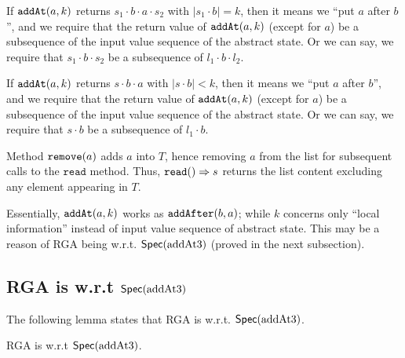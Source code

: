 If $\alabelshort[\mathtt{addAt}]{a,k}$ returns $s_1 \cdot b \cdot a \cdot s_2$ with $\vert s_1 \cdot b \vert = k$, then it means we ``put $a$ after $b$'', and we require that the return value of $\alabelshort[\mathtt{addAt}]{a,k}$ (except for $a$) be a subsequence of the input value sequence of the abstract state. Or we can say, we require that $s_1 \cdot b \cdot s_2$ be a subsequence of $l_1 \cdot b \cdot l_2$.

If $\alabelshort[\mathtt{addAt}]{a,k}$ returns $s \cdot b \cdot a$ with $\vert s \cdot b \vert < k$, then it means we ``put $a$ after $b$'', and we require that the return value of $\alabelshort[\mathtt{addAt}]{a,k}$ (except for $a$) be a subsequence of the input value sequence of the abstract state. Or we can say, we require that $s \cdot b$ be a subsequence of $l_1 \cdot b$.

Method $\alabelshort[\mathtt{remove}]{a}$ adds $a$ into $T$, hence removing $a$ from the list for subsequent calls to the $\mathtt{read}$ method. Thus, $\alabellong[\mathtt{read}]{}{s}{}$ returns the list content excluding any element appearing in $T$.

Essentially, $\alabelshort[\mathtt{addAt}]{a,k}$ works as $\alabelshort[\mathtt{addAfter}]{b,a}$; while $k$ concerns only ``local information'' instead of input value sequence of abstract state. This may be a reason of RGA being \crdtlinearizable{} w.r.t. $\specAddatThree$ (proved in the next subsection).







\subsection{RGA is \crdtlinearizable{} w.r.t $\specAddatThree$}
\label{subsec:RGA is RA-linearizable w.r.t specAddatThree}

The following lemma states that RGA is \crdtlinearizable{} w.r.t. $\specAddatThree$.

\begin{lemma}
\label{lemma:RGA is RA-linearizable w.r.t SpecAddatThree}
RGA is \crdtlinearizable{} w.r.t $\specAddatThree$.
\end{lemma}

